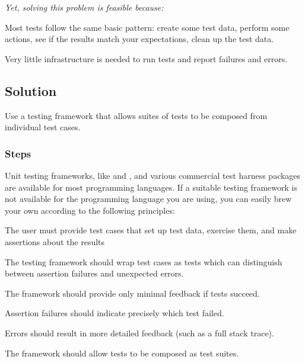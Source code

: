 \documentclass[a4paper,10pt,twoside]{book}
\begin{document}
\emph{Yet, solving this problem is feasible because:}

\begin{bulletlist}
\item Most tests follow the same basic pattern: create some test data, perform some actions, see if the results match your expectations, clean up the test data.
\item Very little infrastructure is needed to run tests and report failures and errors.
\end{bulletlist}

\subsection*{Solution}

Use a testing framework that allows suites of tests to be composed from individual test cases.

\subsubsection*{Steps}

Unit testing frameworks, like  and  \cite{Beck98a}, and various commercial test harness packages are available for most programming languages. If a suitable testing framework is not available for the programming language you are using, you can easily brew your own according to the following principles:

\begin{bulletlist}
\item The user must provide test cases that set up test data, exercise them, and make assertions about the results
\item The testing framework should wrap test cases as tests which can distinguish between assertion failures and unexpected errors.
\item The framework should provide only minimal feedback if tests succeed.

\begin{bulletlist}
\item Assertion failures should indicate precisely which test failed.

\item Errors should result in more detailed feedback (such as a full stack trace).
\end{bulletlist}

\item The framework should allow tests to be composed as test suites.
\end{bulletlist}
\end{document}
